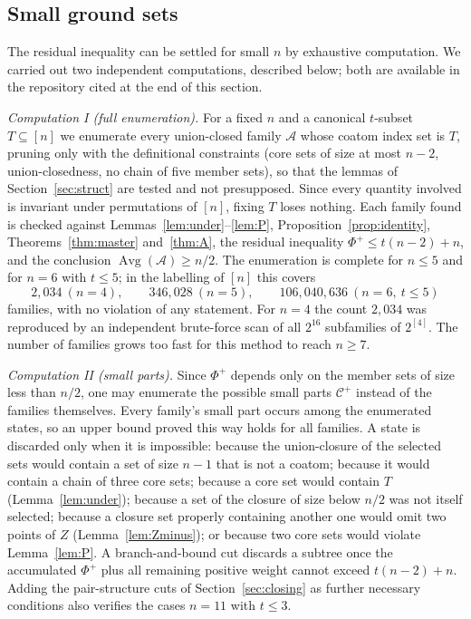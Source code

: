\documentclass[11pt,a4paper]{amsart}
\theoremstyle{plain}
\theoremstyle{definition}
\newcommand{\A}{\mathcal{A}}
\newcommand{\Cc}{\mathcal{C}}
\newcommand{\Avg}{\operatorname{Avg}}
\newcommand{\Cp}{\Cc^{+}}
\begin{document}
\subsection*{Small ground sets}

The residual inequality can be settled for small $n$ by exhaustive computation.
We carried out two independent computations, described below; both are available
in the repository cited at the end of this section.

\emph{Computation I (full enumeration).} For a fixed $n$ and a canonical
$t$-subset $T\subseteq[n]$ we enumerate every union-closed family $\A$ whose
coatom index set is $T$, pruning only with the definitional constraints (core
sets of size at most $n-2$, union-closedness, no chain of five member sets), so
that the lemmas of Section~\ref{sec:struct} are tested and not presupposed.
Since every quantity involved is invariant under permutations of $[n]$, fixing
$T$ loses nothing. Each family found is checked against
Lemmas~\ref{lem:under}--\ref{lem:P}, Proposition~\ref{prop:identity},
Theorems~\ref{thm:master} and~\ref{thm:A}, the residual inequality
$\Phi^+\le t(n-2)+n$, and the conclusion $\Avg(\A)\ge n/2$. The enumeration is
complete for $n\le5$ and for $n=6$ with $t\le5$; in the labelling of $[n]$ this
covers
\[
  2{,}034\ (n=4),\qquad
  346{,}028\ (n=5),\qquad
  106{,}040{,}636\ (n=6,\ t\le5)
\]
families, with no violation of any statement. For $n=4$ the count $2{,}034$ was
reproduced by an independent brute-force scan of all $2^{16}$ subfamilies of
$2^{[4]}$. The number of families grows too fast for this method to reach
$n\ge7$.

\emph{Computation II (small parts).} Since $\Phi^+$ depends only on the member
sets of size less than $n/2$, one may enumerate the possible small parts $\Cp$
instead of the families themselves. Every family's small part occurs among the
enumerated states, so an upper bound proved this way holds for all families.
A state is discarded only when it is impossible: because the union-closure of
the selected sets would contain a set of size $n-1$ that is not a coatom;
because it would contain a chain of three core sets; because a core set would
contain $T$ (Lemma~\ref{lem:under}); because a set of the closure of size below
$n/2$ was not itself selected; because a closure set properly containing another
one would omit two points of $Z$ (Lemma~\ref{lem:Zminus}); or because two core
sets would violate Lemma~\ref{lem:P}. A branch-and-bound cut discards a subtree
once the accumulated $\Phi^+$ plus all remaining positive weight cannot exceed
$t(n-2)+n$. Adding the pair-structure cuts of Section~\ref{sec:closing} as
further necessary conditions also verifies the cases $n=11$ with $t\le3$.
\end{document}
